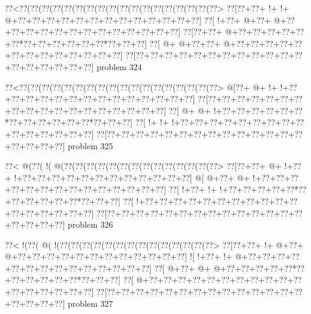 \vbox{\vbox{\goo
\0??<\0??(\0??(\0??(\0??(\0??(\0??(\0??(\0??(\0??(\0??(\0??(\0??(\0??(\0??(\0??(\0??(\0??(\0??>
\0??[\0??+\0??+\- !+\- !+\- @+\0??+\0??+\0??+\0??+\0??+\0??+\0??+\0??+\0??+\0??+\0??+\0??+\0??]
\0??[\- !+\0??+\- @+\0??+\- @+\0??+\0??+\0??+\0??+\0??+\0??+\0??+\0??+\0??+\0??+\0??+\0??+\0??]
\0??[\0??+\0??+\- @+\0??+\0??+\0??+\0??+\0??+\0??*\0??+\0??+\0??+\0??+\0??+\0??*\0??+\0??+\0??]
\0??[\- @+\- @+\0??+\0??+\- @+\0??+\0??+\0??+\0??+\0??+\0??+\0??+\0??+\0??+\0??+\0??+\0??+\0??]
\0??[\0??+\0??+\0??+\0??+\0??+\0??+\0??+\0??+\0??+\0??+\0??+\0??+\0??+\0??+\0??+\0??+\0??+\0??]
}
\hfil problem 324\hfil\break
}



\vbox{\vbox{\goo
\0??<\0??(\0??(\0??(\0??(\0??(\0??(\0??(\0??(\0??(\0??(\0??(\0??(\0??(\0??(\0??(\0??(\0??(\0??>
\- @[\0??+\- @+\- !+\- !+\0??+\0??+\0??+\0??+\0??+\0??+\0??+\0??+\0??+\0??+\0??+\0??+\0??+\0??]
\0??[\0??+\0??+\0??+\0??+\0??+\0??+\0??+\0??+\0??+\0??+\0??+\0??+\0??+\0??+\0??+\0??+\0??+\0??]
\0??[\- @+\- @+\- !+\0??+\0??+\0??+\0??+\0??+\0??*\0??+\0??+\0??+\0??+\0??+\0??*\0??+\0??+\0??]
\0??[\- !+\- !+\- !+\0??+\0??+\0??+\0??+\0??+\0??+\0??+\0??+\0??+\0??+\0??+\0??+\0??+\0??+\0??]
\0??[\0??+\0??+\0??+\0??+\0??+\0??+\0??+\0??+\0??+\0??+\0??+\0??+\0??+\0??+\0??+\0??+\0??+\0??]
}
\hfil problem 325\hfil\break
}



\vbox{\vbox{\goo
\0??<\- @(\0??(\- !(\- @(\0??(\0??(\0??(\0??(\0??(\0??(\0??(\0??(\0??(\0??(\0??(\0??(\0??(\0??>
\0??[\0??+\0??+\- @+\- !+\0??+\- !+\0??+\0??+\0??+\0??+\0??+\0??+\0??+\0??+\0??+\0??+\0??+\0??]
\- @[\- @+\0??+\- @+\- !+\0??+\0??+\0??+\0??+\0??+\0??+\0??+\0??+\0??+\0??+\0??+\0??+\0??+\0??]
\0??[\- !+\0??+\- !+\- !+\0??+\0??+\0??+\0??+\0??*\0??+\0??+\0??+\0??+\0??+\0??*\0??+\0??+\0??]
\0??[\- !+\0??+\0??+\0??+\0??+\0??+\0??+\0??+\0??+\0??+\0??+\0??+\0??+\0??+\0??+\0??+\0??+\0??]
\0??[\0??+\0??+\0??+\0??+\0??+\0??+\0??+\0??+\0??+\0??+\0??+\0??+\0??+\0??+\0??+\0??+\0??+\0??]
}
\hfil problem 326\hfil\break
}



\vbox{\vbox{\goo
\0??<\- !(\0??(\- @(\- !(\0??(\0??(\0??(\0??(\0??(\0??(\0??(\0??(\0??(\0??(\0??(\0??(\0??(\0??>
\0??[\0??+\0??+\- !+\- @+\0??+\- @+\0??+\0??+\0??+\0??+\0??+\0??+\0??+\0??+\0??+\0??+\0??+\0??]
\- ![\- !+\0??+\- !+\- @+\0??+\0??+\0??+\0??+\0??+\0??+\0??+\0??+\0??+\0??+\0??+\0??+\0??+\0??]
\0??[\- @+\0??+\- @+\- @+\0??+\0??+\0??+\0??+\0??*\0??+\0??+\0??+\0??+\0??+\0??*\0??+\0??+\0??]
\0??[\- @+\0??+\0??+\0??+\0??+\0??+\0??+\0??+\0??+\0??+\0??+\0??+\0??+\0??+\0??+\0??+\0??+\0??]
\0??[\0??+\0??+\0??+\0??+\0??+\0??+\0??+\0??+\0??+\0??+\0??+\0??+\0??+\0??+\0??+\0??+\0??+\0??]
}
\hfil problem 327\hfil\break
}




